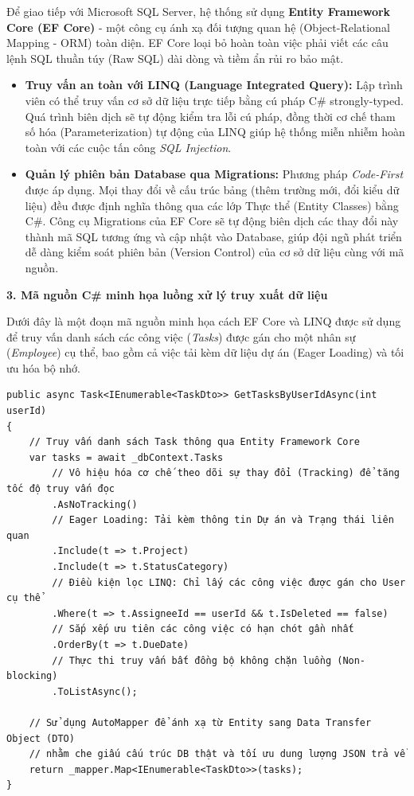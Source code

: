 \documentclass[a4paper,13.5pt]{extreport}
\begin{document}
Để giao tiếp với Microsoft SQL Server, hệ thống sử dụng \textbf{Entity Framework Core (EF Core)} - một công cụ ánh xạ đối tượng quan hệ (Object-Relational Mapping - ORM) toàn diện. EF Core loại bỏ hoàn toàn việc phải viết các câu lệnh SQL thuần túy (Raw SQL) dài dòng và tiềm ẩn rủi ro bảo mật.
\begin{itemize}
    \item \textbf{Truy vấn an toàn với LINQ (Language Integrated Query):} Lập trình viên có thể truy vấn cơ sở dữ liệu trực tiếp bằng cú pháp C\# strongly-typed. Quá trình biên dịch sẽ tự động kiểm tra lỗi cú pháp, đồng thời cơ chế tham số hóa (Parameterization) tự động của LINQ giúp hệ thống miễn nhiễm hoàn toàn với các cuộc tấn công \textit{SQL Injection}.
    \item \textbf{Quản lý phiên bản Database qua Migrations:} Phương pháp \textit{Code-First} được áp dụng. Mọi thay đổi về cấu trúc bảng (thêm trường mới, đổi kiểu dữ liệu) đều được định nghĩa thông qua các lớp Thực thể (Entity Classes) bằng C\#. Công cụ Migrations của EF Core sẽ tự động biên dịch các thay đổi này thành mã SQL tương ứng và cập nhật vào Database, giúp đội ngũ phát triển dễ dàng kiểm soát phiên bản (Version Control) của cơ sở dữ liệu cùng với mã nguồn.
\end{itemize}

\textbf{3. Mã nguồn C\# minh họa luồng xử lý truy xuất dữ liệu}

Dưới đây là một đoạn mã nguồn minh họa cách EF Core và LINQ được sử dụng để truy vấn danh sách các công việc (\textit{Tasks}) được gán cho một nhân sự (\textit{Employee}) cụ thể, bao gồm cả việc tải kèm dữ liệu dự án (Eager Loading) và tối ưu hóa bộ nhớ.

\begin{verbatim}
public async Task<IEnumerable<TaskDto>> GetTasksByUserIdAsync(int userId)
{
    // Truy vấn danh sách Task thông qua Entity Framework Core
    var tasks = await _dbContext.Tasks
        // Vô hiệu hóa cơ chế theo dõi sự thay đổi (Tracking) để tăng tốc độ truy vấn đọc
        .AsNoTracking()
        // Eager Loading: Tải kèm thông tin Dự án và Trạng thái liên quan
        .Include(t => t.Project)
        .Include(t => t.StatusCategory)
        // Điều kiện lọc LINQ: Chỉ lấy các công việc được gán cho User cụ thể
        .Where(t => t.AssigneeId == userId && t.IsDeleted == false)
        // Sắp xếp ưu tiên các công việc có hạn chót gần nhất
        .OrderBy(t => t.DueDate)
        // Thực thi truy vấn bất đồng bộ không chặn luồng (Non-blocking)
        .ToListAsync();

    // Sử dụng AutoMapper để ánh xạ từ Entity sang Data Transfer Object (DTO)
    // nhằm che giấu cấu trúc DB thật và tối ưu dung lượng JSON trả về
    return _mapper.Map<IEnumerable<TaskDto>>(tasks);
}
\end{verbatim}
\end{document}
